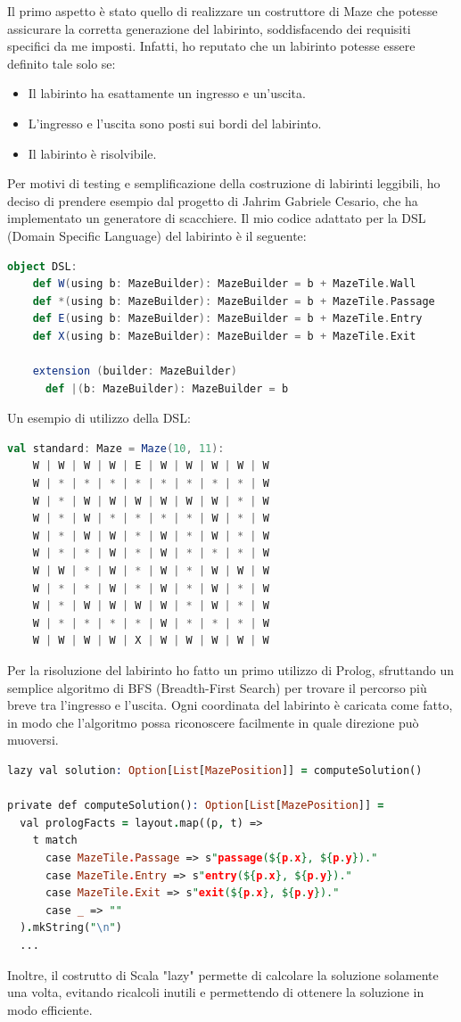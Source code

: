 Il primo aspetto è stato quello di realizzare un costruttore di Maze che potesse assicurare la
corretta generazione del labirinto, soddisfacendo dei requisiti specifici da me imposti.
Infatti, ho reputato che un labirinto potesse essere definito tale solo se:
\begin{itemize}
    \item Il labirinto ha esattamente un ingresso e un'uscita.
    \item L'ingresso e l'uscita sono posti sui bordi del labirinto.
    \item Il labirinto è risolvibile.
\end{itemize}
Per motivi di testing e semplificazione della costruzione di labirinti leggibili, ho deciso di 
prendere esempio dal progetto di Jahrim Gabriele Cesario\cite{pps22chess}, che ha implementato un generatore di
scacchiere. Il mio codice adattato per la DSL (Domain Specific Language) del labirinto è il seguente:
\newpage
\begin{lstlisting}[language=Scala]
object DSL:
    def W(using b: MazeBuilder): MazeBuilder = b + MazeTile.Wall
    def *(using b: MazeBuilder): MazeBuilder = b + MazeTile.Passage
    def E(using b: MazeBuilder): MazeBuilder = b + MazeTile.Entry
    def X(using b: MazeBuilder): MazeBuilder = b + MazeTile.Exit

    extension (builder: MazeBuilder)
      def |(b: MazeBuilder): MazeBuilder = b
\end{lstlisting}
Un esempio di utilizzo della DSL:
\begin{lstlisting}[language=Scala]
val standard: Maze = Maze(10, 11):
    W | W | W | W | E | W | W | W | W | W
    W | * | * | * | * | * | * | * | * | W
    W | * | W | W | W | W | W | W | * | W
    W | * | W | * | * | * | * | W | * | W
    W | * | W | W | * | W | * | W | * | W
    W | * | * | W | * | W | * | * | * | W
    W | W | * | W | * | W | * | W | W | W
    W | * | * | W | * | W | * | W | * | W
    W | * | W | W | W | W | * | W | * | W
    W | * | * | * | * | W | * | * | * | W
    W | W | W | W | X | W | W | W | W | W
\end{lstlisting}

Per la risoluzione del labirinto ho fatto un primo utilizzo di Prolog, sfruttando un semplice 
algoritmo di BFS (Breadth-First Search) per trovare il percorso più breve tra l'ingresso e l'uscita.
Ogni coordinata del labirinto è caricata come fatto, in modo che l'algoritmo possa
riconoscere facilmente in quale direzione può muoversi.
\newpage
\begin{lstlisting}[language=Prolog]
lazy val solution: Option[List[MazePosition]] = computeSolution()

private def computeSolution(): Option[List[MazePosition]] =
  val prologFacts = layout.map((p, t) =>
    t match
      case MazeTile.Passage => s"passage(${p.x}, ${p.y})."
      case MazeTile.Entry => s"entry(${p.x}, ${p.y})."
      case MazeTile.Exit => s"exit(${p.x}, ${p.y})."
      case _ => ""
  ).mkString("\n")
  ...
\end{lstlisting}
Inoltre, il costrutto di Scala "lazy" permette di calcolare la soluzione solamente una volta, evitando
ricalcoli inutili e permettendo di ottenere la soluzione in modo efficiente.

